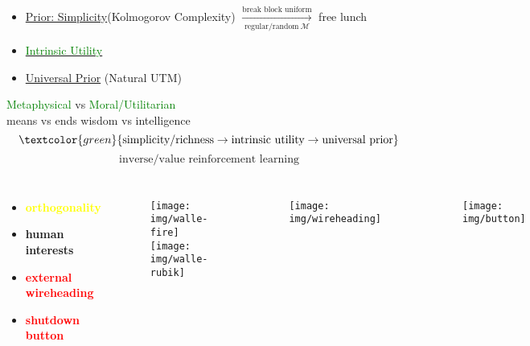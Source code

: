 \documentclass[UTF8,11pt,colorlinks,compress,openany]{beamer}%
\begin{document}
\begin{frame}\frametitle{}
	\begin{itemize}
		\item \underline{Prior: Simplicity}(Kolmogorov Complexity) $\xrightarrow[\text{regular/random}~\mathcal{M}]{\text{break block uniform}}$ free lunch
		\item \underline{\textcolor{green}{Intrinsic Utility}}
		\item \underline{Universal Prior} (Natural UTM)
	\end{itemize}
		\centering\textcolor{green}{Metaphysical} vs \textcolor{green}{Moral/Utilitarian} \\
		means vs ends \qquad wisdom vs intelligence
	\[\textcolor{green}{\mbox{simplicity/richness}\to\mbox{intrinsic utility}\to\mbox{universal prior}}\]
	\[\mbox{inverse/value reinforcement learning}\]\vspace{-3ex}
\begin{columns}
	\begin{itemize}
		\item \textcolor{yellow}{\textbf{orthogonality}}
		\item \textbf{human interests}
		\item \textcolor{red}{\textbf{external wireheading}}
		\item \textcolor{red}{\textbf{shutdown button}}
	\end{itemize}
	\begin{figure}[H]
		\begin{center}
			\texttt{[image: img/walle-fire]}\\
			\texttt{[image: img/walle-rubik]}
		\end{center}
	\end{figure}
	\begin{figure}[H]
		\begin{center}
			\texttt{[image: img/wireheading]}
		\end{center}
	\end{figure}
	\begin{figure}[H]
		\begin{center}
			\texttt{[image: img/button]}
		\end{center}
	\end{figure}
\end{columns}
\end{frame}
\end{document}

